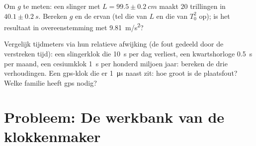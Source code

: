 \begin{exercise}[$\star\star\star$]\label{exo:g12:oscillators-and-time:14}
Om $g$ te meten: een slinger met $L = 99.5 \pm \qty{0.2}{cm}$ maakt $20$
trillingen in $40.1 \pm \qty{0.2}{s}$. Bereken $g$ en de  ervan (tel die van $L$ en die van $T_0^2$ op); is het resultaat
in overeenstemming met \qty{9.81}{m/s^2}?
\end{exercise}

\begin{exercise}[$\star\star\star$]\label{exo:g12:oscillators-and-time:15}
Vergelijk tijdmeters via hun relatieve afwijking (de fout gedeeld door de
verstreken tijd): een slingerklok die \qty{10}{s} per dag verliest, een
kwartshorloge \qty{0.5}{s} per maand, een cesiumklok \qty{1}{s} per honderd
miljoen jaar: bereken de drie verhoudingen. Een gps-klok die er
\qty{1}{\micro s} naast zit: hoe groot is de plaatsfout? Welke familie heeft
gps nodig?
\end{exercise}

\section{Probleem: De werkbank van de klokkenmaker}

